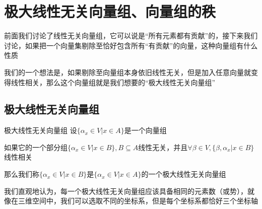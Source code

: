 \documentclass[12pt, a4paper, oneside, UTF8]{ctexbook}
\begin{document}
	\section{极大线性无关向量组、向量组的秩}
		前面我们讨论了线性无关向量组，它可以说是“所有元素都有贡献”的，接下来我们讨论，如果把一个向量集剔除至恰好包含所有“有贡献”的向量，这种向量组有什么性质

		我们的一个想法是，如果剔除至向量组本身依旧线性无关，但是加入任意向量就变得线性相关，那么这个向量组就是我们想要的“极大线性无关向量组”
		\subsection{极大线性无关向量组}
			\begin{defn}{极大线性无关向量组}{}
				设$\{\alpha_x \in V| x \in A\}$是一个向量组

				如果它的一个部分组$\{\alpha_x \in V| x \in B\},B\subseteq A$线性无关，并且$\forall \beta \in V,\{\beta ,\alpha_x| x \in B\}$线性相关

				那么我们称$\{\alpha_x \in V| x \in B\}$是$\{\alpha_x \in V| x \in A\}$的一个极大线性无关向量组
			\end{defn}
			我们直观地认为，每一个极大线性无关向量组应该具备相同的元素数（或势），就像在三维空间中，我们可以选取不同的坐标系，但是每个坐标系都恰好三个坐标轴
\end{document}
